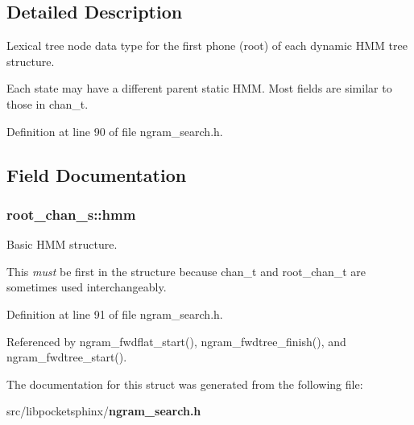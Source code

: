 \subsection{Detailed Description}
Lexical tree node data type for the first phone (root) of each dynamic H\+M\+M tree structure. 

Each state may have a different parent static H\+M\+M. Most fields are similar to those in chan\+\_\+t. 

Definition at line 90 of file ngram\+\_\+search.\+h.



\subsection{Field Documentation}
\subsubsection[{hmm}]{ root\+\_\+chan\+\_\+s\+::hmm}\label{structroot__chan__s_a9d4d92ffa8b4079202ddebe3ba0eb290}


Basic H\+M\+M structure. 

This {\itshape must} be first in the structure because chan\+\_\+t and root\+\_\+chan\+\_\+t are sometimes used interchangeably. 

Definition at line 91 of file ngram\+\_\+search.\+h.



Referenced by ngram\+\_\+fwdflat\+\_\+start(), ngram\+\_\+fwdtree\+\_\+finish(), and ngram\+\_\+fwdtree\+\_\+start().



The documentation for this struct was generated from the following file\+:\begin{DoxyCompactItemize}
\item 
src/libpocketsphinx/{\bf ngram\+\_\+search.\+h}\end{DoxyCompactItemize}
